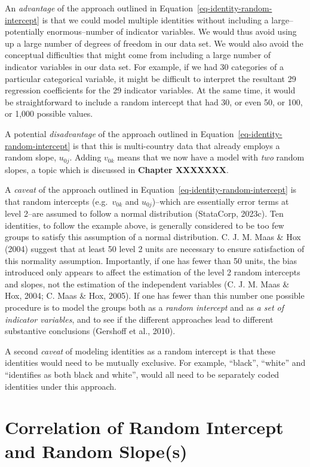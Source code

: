 \documentclass[
  letterpaper,
  DIV=11,
  numbers=noendperiod]{scrreprt}
\begin{document}
An \emph{advantage} of the approach outlined in
Equation~\ref{eq-identity-random-intercept} is that we could model
multiple identities without including a large--potentially
enormous--number of indicator variables. We would thus avoid using up a
large number of degrees of freedom in our data set. We would also avoid
the conceptual difficulties that might come from including a large
number of indicator variables in our data set. For example, if we had 30
categories of a particular categorical variable, it might be difficult
to interpret the resultant 29 regression coefficients for the 29
indicator variables. At the same time, it would be straightforward to
include a random intercept that had 30, or even 50, or 100, or 1,000
possible values.

A potential \emph{disadvantage} of the approach outlined in
Equation~\ref{eq-identity-random-intercept} is that this is
multi-country data that already employs a random slope, \(u_{0j}\).
Adding \(v_{0k}\) means that we now have a model with \emph{two} random
slopes, a topic which is discussed in \textbf{Chapter XXXXXXX}.

A \emph{caveat} of the approach outlined in
Equation~\ref{eq-identity-random-intercept} is that random intercepts
(e.g.~\(v_{0k}\) and \(u_{0j}\))--which are essentially error terms at
level 2--are assumed to follow a normal distribution (StataCorp, 2023c).
Ten identities, to follow the example above, is generally considered to
be too few groups to satisfy this assumption of a normal distribution.
C. J. M. Maas \& Hox (2004) suggest that at least 50 level 2 units are
necessary to ensure satisfaction of this normality assumption.
Importantly, if one has fewer than 50 units, the bias introduced only
appears to affect the estimation of the level 2 random intercepts and
slopes, not the estimation of the independent variables (C. J. M. Maas
\& Hox, 2004; C. Maas \& Hox, 2005). If one has fewer than this number
one possible procedure is to model the groups both as a \emph{random
intercept} and as \emph{a set of indicator variables}, and to see if the
different approaches lead to different substantive conclusions (Gershoff
et al., 2010).

A second \emph{caveat} of modeling identities as a random intercept is
that these identities would need to be mutually exclusive. For example,
``black'', ``white'' and ``identifies as both black and white'', would
all need to be separately coded identities under this approach.

\section{Correlation of Random Intercept and Random
Slope(s)}\label{correlation-of-random-intercept-and-random-slopes}
\end{document}
